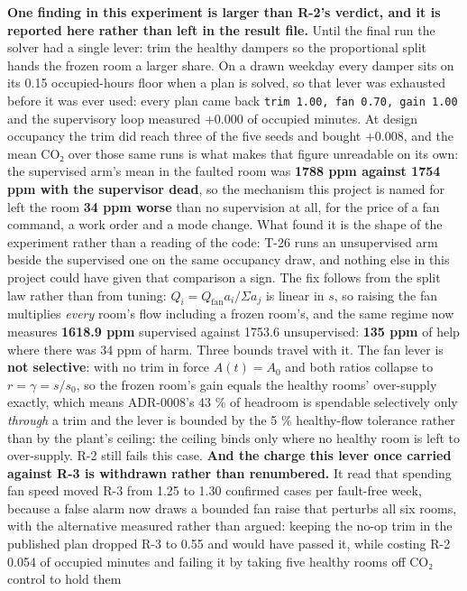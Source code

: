\textbf{One finding in this experiment is larger than R-2's verdict, and it is reported here rather
than left in the result file.} Until the final run the solver had a single lever: trim the healthy
dampers so the proportional split hands the frozen room a larger share. On a drawn weekday every
damper sits on its 0.15 occupied-hours floor when a plan is solved, so that lever was exhausted
before it was ever used: every plan came back \texttt{trim 1.00, fan 0.70, gain 1.00} and the
supervisory loop measured $+0.000$ of occupied minutes. At design occupancy the trim did reach three
of the five seeds and bought $+0.008$, and the mean CO₂ over those same runs is what makes that
figure unreadable on its own: the supervised arm's mean in the faulted room was \textbf{1788 ppm
against 1754 ppm with the supervisor dead}, so the mechanism this project is named for left the room
\textbf{34 ppm worse} than no supervision at all, for the price of a fan command, a work order and a
mode change. What found it is the shape of the
experiment rather than a reading of the code: T-26 runs an unsupervised arm beside the supervised
one on the same occupancy draw, and nothing else in this project could have given that comparison a
sign. The fix follows from the split law rather than from tuning: $Q_i = Q_\text{fan}a_i/\Sigma a_j$
is linear in $s$, so raising the fan multiplies \emph{every} room's flow including a frozen room's,
and the same regime now measures \textbf{1618.9 ppm} supervised against 1753.6 unsupervised:
\textbf{135 ppm} of help where there was 34 ppm of harm. Three bounds travel with it. The fan lever is \textbf{not
selective}: with no trim in force $A(t)=A_0$ and both ratios collapse to $r = \gamma = s/s_0$, so the
frozen room's gain equals the healthy rooms' over-supply exactly, which means ADR-0008's 43 \% of
headroom is spendable selectively only \emph{through} a trim and the lever is bounded by the 5 \%
healthy-flow tolerance rather than by the plant's ceiling: the ceiling binds only where no healthy
room is left to over-supply. R-2 still fails this case. \textbf{And the charge this lever once
carried against R-3 is withdrawn rather than renumbered.} It read that spending fan speed moved R-3
from 1.25 to 1.30 confirmed cases per fault-free week, because a false alarm now draws a bounded fan
raise that perturbs all six rooms, with the alternative measured rather than argued: keeping the
no-op trim in the published plan dropped R-3 to 0.55 and would have passed it, while costing R-2
0.054 of occupied minutes and failing it by taking five healthy rooms off CO₂ control to hold them
